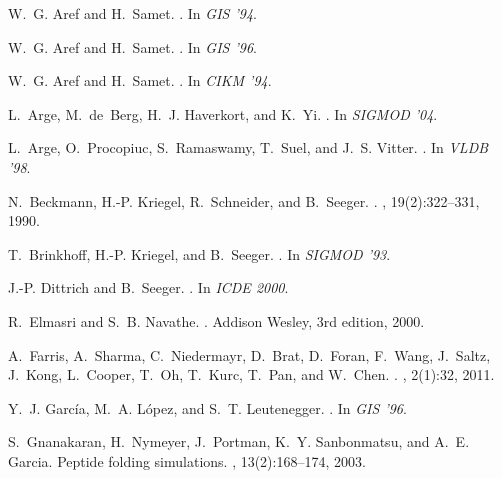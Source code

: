 \documentclass{vldb}
\begin{document}
\begin{thebibliography}{10}
\vspace{2mm}

W.~G. Aref and H.~Samet.
.
\newblock In {\em GIS '94}.

W.~G. Aref and H.~Samet.
.
\newblock In {\em GIS '96}.

W.~G. Aref and H.~Samet.
.
\newblock In {\em CIKM '94}.

L.~Arge, M.~de~Berg, H.~J. Haverkort, and K.~Yi.
.
\newblock In {\em {SIGMOD '04}}.

L.~Arge, O.~Procopiuc, S.~Ramaswamy, T.~Suel, and J.~S. Vitter.
.
\newblock In {\em VLDB '98}.

N.~Beckmann, H.-P. Kriegel, R.~Schneider, and B.~Seeger.
.
, 19(2):322--331, 1990.

T.~Brinkhoff, H.-P. Kriegel, and B.~Seeger.
.
\newblock In {\em SIGMOD '93}.

J.-P. Dittrich and B.~Seeger.
.
\newblock In {\em ICDE 2000}.

R.~Elmasri and S.~B. Navathe.
.
\newblock Addison Wesley, 3rd edition, 2000.

A.~Farris, A.~Sharma, C.~Niedermayr, D.~Brat, D.~Foran, F.~Wang, J.~Saltz,
  J.~Kong, L.~Cooper, T.~Oh, T.~Kurc, T.~Pan, and W.~Chen.
.
, 2(1):32, 2011.

Y.~J. Garc\'ia, M.~A. L\'opez, and S.~T. Leutenegger.
.
\newblock In {\em GIS '96}.

S.~Gnanakaran, H.~Nymeyer, J.~Portman, K.~Y. Sanbonmatsu, and A.~E. Garcia.
\newblock Peptide folding simulations.
, 13(2):168--174, 2003.


\end{thebibliography}
\end{document}
